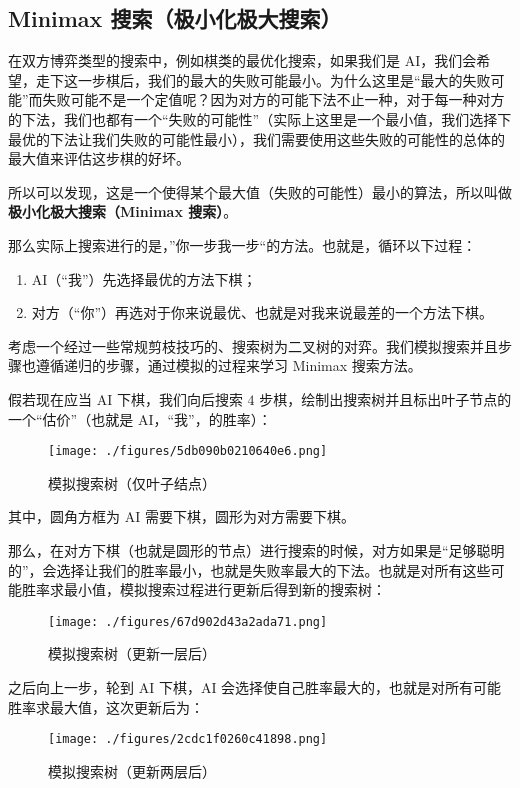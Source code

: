 
\subsection{Minimax 搜索（极小化极大搜索）}
在双方博弈类型的搜索中，例如棋类的最优化搜索，如果我们是 AI，我们会希望，走下这一步棋后，我们的最大的失败可能最小。为什么这里是“最大的失败可能”而失败可能不是一个定值呢？因为对方的可能下法不止一种，对于每一种对方的下法，我们也都有一个“失败的可能性”（实际上这里是一个最小值，我们选择下最优的下法让我们失败的可能性最小），我们需要使用这些失败的可能性的总体的最大值来评估这步棋的好坏。

所以可以发现，这是一个使得某个最大值（失败的可能性）最小的算法，所以叫做\textbf{极小化极大搜索（Minimax 搜索）}。

那么实际上搜索进行的是，”你一步我一步“的方法。也就是，循环以下过程：
\begin{enumerate}
\item AI（“我”）先选择最优的方法下棋；
\item 对方（“你”）再选对于你来说最优、也就是对我来说最差的一个方法下棋。
\end{enumerate}
考虑一个经过一些常规剪枝技巧的、搜索树为二叉树的对弈。我们模拟搜索并且步骤也遵循递归的步骤，通过模拟的过程来学习 Minimax 搜索方法。

假若现在应当 AI 下棋，我们向后搜索 $4$ 步棋，绘制出搜索树并且标出叶子节点的一个“估价”（也就是 AI，“我”，的胜率）：
\begin{figure}[ht]
\centering
\texttt{[image: ./figures/5db090b0210640e6.png]}
\caption{模拟搜索树（仅叶子结点）} \label{fig_mmsab_1}
\end{figure}
其中，圆角方框为 AI 需要下棋，圆形为对方需要下棋。

那么，在对方下棋（也就是圆形的节点）进行搜索的时候，对方如果是“足够聪明的”，会选择让我们的胜率最小，也就是失败率最大的下法。也就是对所有这些可能胜率求最小值，模拟搜索过程进行更新后得到新的搜索树：
\begin{figure}[ht]
\centering
\texttt{[image: ./figures/67d902d43a2ada71.png]}
\caption{模拟搜索树（更新一层后）} \label{fig_mmsab_3}
\end{figure}

之后向上一步，轮到 AI 下棋，AI 会选择使自己胜率最大的，也就是对所有可能胜率求最大值，这次更新后为：
\begin{figure}[ht]
\centering
\texttt{[image: ./figures/2cdc1f0260c41898.png]}
\caption{模拟搜索树（更新两层后）} \label{fig_mmsab_4}
\end{figure}

